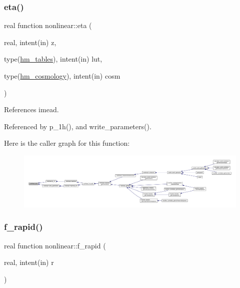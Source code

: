 \subsubsection{\texorpdfstring{eta()}{eta()}}
{\footnotesize\ttfamily real function nonlinear\+::eta (\begin{DoxyParamCaption}\item[{real, intent(in)}]{z,  }\item[{type(\mbox{\hyperlink{structnonlinear_1_1hm__tables}{hm\+\_\+tables}}), intent(in)}]{lut,  }\item[{type(\mbox{\hyperlink{structnonlinear_1_1hm__cosmology}{hm\+\_\+cosmology}}), intent(in)}]{cosm }\end{DoxyParamCaption})\hspace{0.3cm}{\ttfamily [private]}}



References imead.



Referenced by p\+\_\+1h(), and write\+\_\+parameters().

Here is the caller graph for this function\+:
\nopagebreak
\begin{figure}[H]
\begin{center}
\leavevmode
\includegraphics[width=350pt]{namespacenonlinear_a96b424e6fa8e55242e57bbd2e607a70d_icgraph}
\end{center}
\end{figure}
\mbox{\label{namespacenonlinear_a2a0c300b39b9de3d6b00be6369b59944}} 
\subsubsection{\texorpdfstring{f\+\_\+rapid()}{f\_rapid()}}
{\footnotesize\ttfamily real function nonlinear\+::f\+\_\+rapid (\begin{DoxyParamCaption}\item[{real, intent(in)}]{r }\end{DoxyParamCaption})\hspace{0.3cm}{\ttfamily [private]}}



